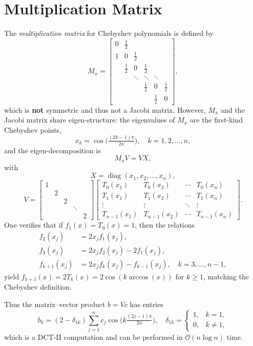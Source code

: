\documentclass[a4paper, 10pt]{article}
\begin{document}
\section{Multiplication Matrix}
The \emph{multiplication matrix} for Chebyshev polynomials is defined by
\begin{equation}
M_x =
\begin{bmatrix}
0 & \tfrac12 &        &        &        &       \\
1 & 0 & \tfrac12 &        &        &       \\
  & \tfrac12 & 0 & \tfrac12 &        &       \\
  &        & \ddots & \ddots & \ddots &       \\
  &        &        & \tfrac12 & 0 & \tfrac12 \\
  &        &        &        & \tfrac12 & 0
\end{bmatrix},
\end{equation}
which is \textbf{not} symmetric and thus not a Jacobi matrix. However, $M_x$ and the Jacobi matrix share eigen-structure: the eigenvalues of $M_x$ are the first-kind Chebyshev points,
\[
x_k = \cos\bigl(\tfrac{(2k-1)\pi}{2n}\bigr),\quad k=1,2,\dots,n,
\]
and the eigen-decomposition is
\[
M_x V = V X,
\]
with
\[
X = \operatorname{diag}(x_1, x_2, \dots, x_n),
\]
\[
V =
\begin{bmatrix}
1      &        &        &        \\
       & 2      &        &        \\
       &        & 2      &        \\
       &        &        & \ddots\\
       &        &        &        & 2
\end{bmatrix}
\begin{bmatrix}
T_0(x_1) & T_0(x_2) & \cdots & T_0(x_n) \\
T_1(x_1) & T_1(x_2) & \cdots & T_1(x_n) \\
\vdots   & \vdots   & \ddots & \vdots   \\
T_{n-1}(x_1) & T_{n-1}(x_2) & \cdots & T_{n-1}(x_n)
\end{bmatrix}.
\]
One verifies that if $f_1(x)=T_0(x)=1$, then the relations
\[
\begin{aligned}
 f_2(x_j)&=2x_jf_1(x_j),\\
 f_3(x_j)&=2x_jf_2(x_j)-2f_1(x_j),\\
 f_{k+1}(x_j)&=2x_jf_k(x_j)-f_{k-1}(x_j),\quad k=3,\dots,n-1,
\end{aligned}
\]
yield $f_{k+1}(x)=2T_k(x)=2\cos(k\arccos(x))$ for $k\ge1$, matching the Chebyshev definition.

Thus the matrix–vector product $b=Vc$ has entries
\[
b_k=(2-\delta_{1k})\sum_{j=1}^n c_j\cos\bigl(k\tfrac{(2j-1)\pi}{2n}\bigr),\quad \delta_{1k}=\begin{cases}1,&k=1,\\0,&k\neq1,\end{cases}
\]
which is a DCT-II computation and can be performed in $\mathcal{O}(n\log n)$ time.
\end{document}
